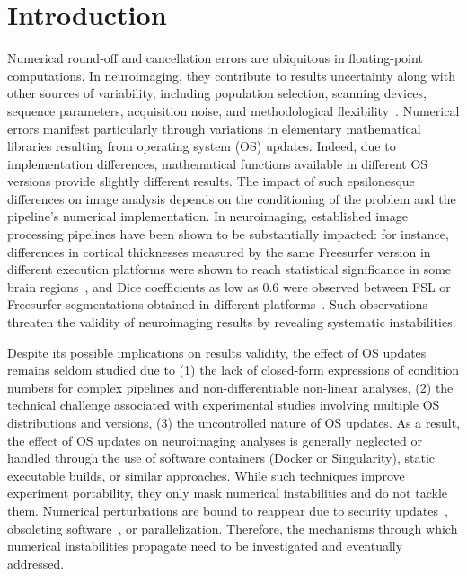 \section{Introduction}

Numerical round-off and cancellation errors are ubiquitous in
floating-point computations. In neuroimaging, they contribute to results
uncertainty along with other sources of variability, including population
selection, scanning devices, sequence parameters, acquisition noise, and
methodological
flexibility~\cite{bowring2019exploring,botvinik2020variability}. Numerical
errors manifest particularly through variations in elementary mathematical
libraries resulting from operating system (OS) updates. Indeed, due to
implementation differences, mathematical functions available in different
OS versions provide slightly different results. The impact of such
epsilonesque differences on image analysis depends on the conditioning of
the problem and the pipeline's numerical implementation. In neuroimaging,
established image processing pipelines have been shown to be substantially
impacted: for instance, differences in cortical thicknesses measured by the
same Freesurfer version in different execution platforms were shown to
reach statistical significance in some brain
regions~\cite{Gronenschild2012}, and Dice coefficients as low as 0.6 were
observed between FSL or Freesurfer segmentations obtained in different
platforms~\cite{Glatard2015,salari2020spot}. Such observations 
threaten the validity of neuroimaging results by revealing systematic
instabilities.

Despite its possible implications on results validity, the effect of OS
updates remains seldom studied due to (1) the lack of closed-form
expressions of condition numbers for complex pipelines and
non-differentiable non-linear analyses, (2) the technical challenge
associated with experimental studies involving multiple OS distributions
and versions, (3) the uncontrolled nature of OS updates.  As a result, the
effect of OS updates on neuroimaging analyses is generally neglected or
handled through the use of software containers (Docker or Singularity),
static executable builds, or similar approaches. While such techniques improve experiment portability,
they only mask numerical instabilities and do not tackle them. Numerical perturbations are bound to reappear
due to security updates~\cite{kaur2021analysis}, obsoleting software~\cite{perkel2020challenge}, or parallelization.
Therefore, the mechanisms through which numerical instabilities propagate need to be investigated and eventually addressed.

